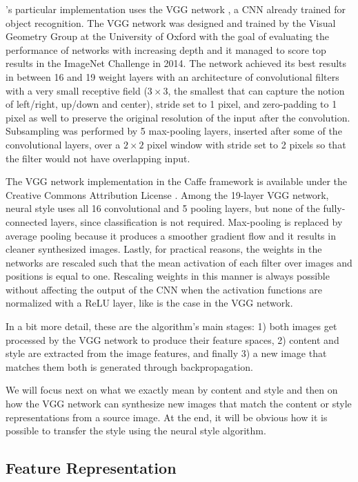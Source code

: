 \citeauthor{Gatys2015B}'s particular implementation uses the VGG network \cite{Simonyan2014}, a CNN already trained for object recognition.
The VGG network was designed and trained by the Visual Geometry Group at the University of Oxford with the goal of evaluating the performance of networks with increasing depth and it managed to score top results in the ImageNet Challenge in 2014.
The network achieved its best results in between 16 and 19 weight layers with an architecture of convolutional filters with a very small receptive field (${3}\times{3}$, the smallest that can capture the notion of left/right, up/down and center), stride set to 1 pixel, and zero-padding to 1 pixel as well to preserve the original resolution of the input after the convolution.
Subsampling was performed by 5 max-pooling layers, inserted after some of the convolutional layers, over a ${2}\times{2}$ pixel window with stride set to 2 pixels so that the filter would not have overlapping input.

The VGG network implementation in the Caffe framework is available under the Creative Commons Attribution License \cite{Simonyan2014web}.
Among the 19-layer VGG network, neural style uses all 16 convolutional and 5 pooling layers, but none of the fully-connected layers, since classification is not required.
Max-pooling is replaced by average pooling because it produces a smoother gradient flow \cite{Boureau2010} and it results in cleaner synthesized images.
Lastly, for practical reasons, the weights in the networks are rescaled such that the mean activation of each filter over images and positions is equal to one.
Rescaling weights in this manner is always possible without affecting the output of the CNN when the activation functions are normalized with a ReLU layer, like is the case in the VGG network.

In a bit more detail, these are the algorithm's main stages: 1) both images get processed by the VGG network to produce their feature spaces, 2) content and style are extracted from the image features, and finally 3) a new image that matches them both is generated through backpropagation.

We will focus next on what we exactly mean by content and style and then on how the VGG network can synthesize new images that match the content or style representations from a source image.
At the end, it will be obvious how it is possible to transfer the style using the neural style algorithm.


\subsection{Feature Representation}
\label{sub:system:method:representations}

